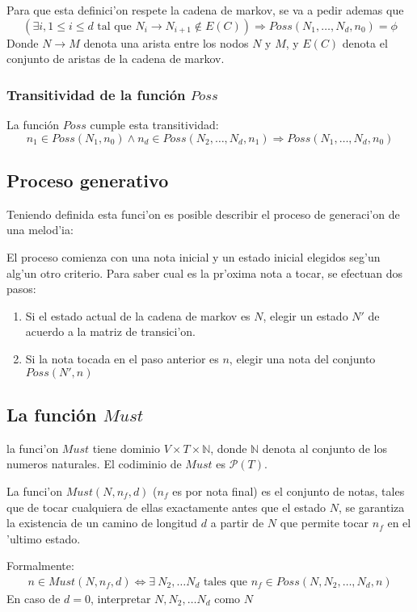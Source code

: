 Para que esta definici'on respete la cadena de markov, se va a pedir ademas que 
$$(\exists i, 1 \leq i \leq d \text{ tal que } N_i \rightarrow N_{i+1} \notin E(C)) \Rightarrow Poss(N_1, \dots, N_d, n_0) = \phi$$
Donde $N \rightarrow M$ denota una arista entre los nodos $N$ y $M$, y $E(C)$ denota el conjunto de aristas de la cadena de markov. 

\subsubsection{Transitividad de la funci\'on $Poss$}
La funci\'on $Poss$ cumple esta transitividad:
$$ n_1 \in Poss(N_1, n_0) \land n_d \in Poss(N_2,\dots,N_d, n_1) \Rightarrow Poss(N_1,\dots,N_d,n_0)$$


\subsection{Proceso generativo}
Teniendo definida esta funci'on es posible describir el proceso de generaci'on de una melod'ia:

El proceso comienza con una nota inicial y un estado inicial elegidos seg'un alg'un otro criterio. 
Para saber cual es la pr'oxima nota a tocar, se efectuan dos pasos:
\begin{enumerate}
 \item Si el estado actual de la cadena de markov es $N$, elegir un estado $N'$ de acuerdo a la matriz de transici'on.
 \item Si la nota tocada en el paso anterior es $n$, elegir una nota del conjunto $Poss(N', n)$
\end{enumerate}


\subsection{La funci\'on $Must$}
la funci'on $Must$ tiene dominio $V \times T \times \mathbb{N}$, donde $\mathbb{N}$ denota al conjunto de los numeros naturales.
El codiminio de $Must$ es $\mathcal{P}(T)$.

La funci'on $Must(N, n_f, d)$ ($n_f$ es por nota final) es el conjunto de notas, tales que de tocar cualquiera de ellas
exactamente antes que el estado $N$, se garantiza la existencia de un camino de longitud $d$ a partir de $N$ que permite tocar
$n_f$ en el 'ultimo estado.

Formalmente:
\begin{align}
n \in Must(N, n_f, d) \Leftrightarrow \exists\ N_2, \dots N_d \text{ tales que } n_f \in Poss(N, N_2, \dots, N_d, n) 
\end{align}
En caso de $d=0$, interpretar $N, N_2, \dots N_d$ como $N$
 
